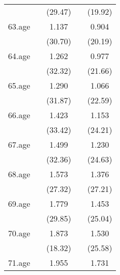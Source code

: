 {\begin{tabular}{l*{4}{c}}
            &                     &     (29.47)         &                     &     (19.92)         \\
[1em]
63.age      &                     &       1.137\sym{***}&                     &       0.904\sym{***}\\
            &                     &     (30.70)         &                     &     (20.19)         \\
[1em]
64.age      &                     &       1.262\sym{***}&                     &       0.977\sym{***}\\
            &                     &     (32.32)         &                     &     (21.66)         \\
[1em]
65.age      &                     &       1.290\sym{***}&                     &       1.066\sym{***}\\
            &                     &     (31.87)         &                     &     (22.59)         \\
[1em]
66.age      &                     &       1.423\sym{***}&                     &       1.153\sym{***}\\
            &                     &     (33.42)         &                     &     (24.21)         \\
[1em]
67.age      &                     &       1.499\sym{***}&                     &       1.230\sym{***}\\
            &                     &     (32.36)         &                     &     (24.63)         \\
[1em]
68.age      &                     &       1.573\sym{***}&                     &       1.376\sym{***}\\
            &                     &     (27.32)         &                     &     (27.21)         \\
[1em]
69.age      &                     &       1.779\sym{***}&                     &       1.453\sym{***}\\
            &                     &     (29.85)         &                     &     (25.04)         \\
[1em]
70.age      &                     &       1.873\sym{***}&                     &       1.530\sym{***}\\
            &                     &     (18.32)         &                     &     (25.58)         \\
[1em]
71.age      &                     &       1.955\sym{***}&                     &       1.731\sym{***}\\

\end{tabular}}
